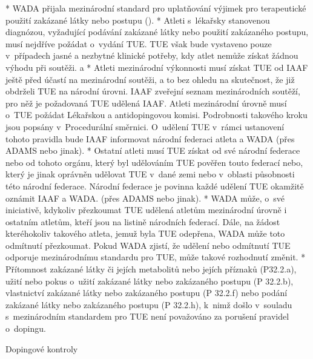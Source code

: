 * WADA přijala mezinárodní standard pro uplatňování výjimek pro terapeutické použití zakázané látky nebo postupu ().
* Atleti s~lékařsky stanovenou diagnózou, vyžadující podávání zakázané látky nebo použití zakázaného postupu, musí nejdříve požádat o~vydání TUE. TUE však bude vystaveno pouze v~případech jasné a nezbytné klinické potřeby, kdy atlet nemůže získat žádnou výhodu při soutěži.
  \begitems \style a
  * Atleti mezinárodní výkonnosti musí získat TUE od IAAF ještě před účastí na mezinárodní soutěži, a to bez ohledu na skutečnost, že již obdrželi TUE na národní úrovni. IAAF zveřejní seznam mezinárodních soutěží, pro něž je požadovaná TUE udělená IAAF. Atleti mezinárodní úrovně musí o~TUE požádat Lékařskou a antidopingovou komisi. Podrobnosti takového kroku jsou popsány v~Procedurální směrnici. O~udělení TUE v~rámci ustanovení tohoto pravidla bude IAAF informovat  národní federaci atleta a WADA (přes ADAMS nebo jinak).
  * Ostatní atleti musí TUE získat od své národní federace nebo od tohoto orgánu, který byl udělováním TUE pověřen touto federací nebo, který je jinak oprávněn udělovat TUE v~dané zemi nebo v~oblasti působnosti této národní federace. Národní federace je povinna každé udělení TUE okamžitě oznámit IAAF a WADA. (přes ADAMS nebo jinak).
  * WADA může, o~své iniciativě, kdykoliv přezkoumat TUE udělená atletům mezinárodní úrovně i ostatním atletům, kteří jsou na listině národních federací. Dále, na žádost kteréhokoliv takového atleta, jemuž byla TUE odepřena, WADA může toto odmítnutí přezkoumat. Pokud WADA zjistí, že udělení nebo odmítnutí TUE odporuje mezinárodnímu standardu pro TUE, může takové rozhodnutí změnit.
  * Přítomnost zakázané látky či jejích metabolitů nebo jejích příznaků (P32.2.a), užití nebo pokus o~užití zakázané látky nebo zakázaného postupu (P 32.2.b), vlastnictví zakázané látky nebo zakázaného postupu (P 32.2.f) nebo podání zakázané látky nebo zakázaného postupu (P 32.2.h), k~nimž došlo v~souladu s~mezinárodním standardem pro TUE není považováno za porušení pravidel o~dopingu.
  \enditems
\enditems

\secc Dopingové kontroly

